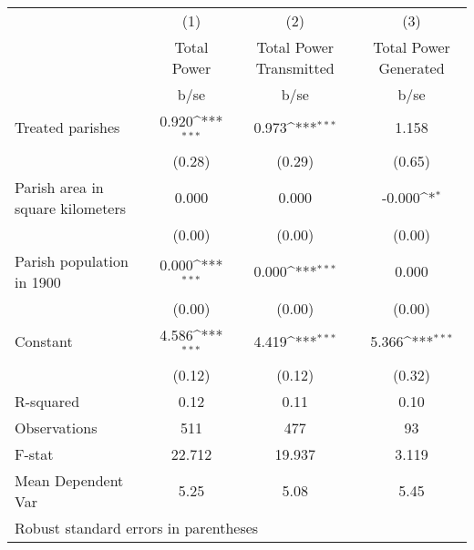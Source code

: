 {
\def\sym#1{\ifmmode^{#1}\else\(^{#1}\)\fi}
\begin{tabular}{l*{3}{c}}
\hline\hline
                    &\multicolumn{1}{c}{(1)}         &\multicolumn{1}{c}{(2)}         &\multicolumn{1}{c}{(3)}         \\
                    & Total Power         &Total Power Transmitted         &Total Power Generated         \\
                    &        b/se         &        b/se         &        b/se         \\
\hline
Treated parishes    &       0.920\sym{***}&       0.973\sym{***}&       1.158         \\
                    &      (0.28)         &      (0.29)         &      (0.65)         \\
Parish area in square kilometers&       0.000         &       0.000         &      -0.000\sym{*}  \\
                    &      (0.00)         &      (0.00)         &      (0.00)         \\
Parish population in 1900&       0.000\sym{***}&       0.000\sym{***}&       0.000         \\
                    &      (0.00)         &      (0.00)         &      (0.00)         \\
Constant            &       4.586\sym{***}&       4.419\sym{***}&       5.366\sym{***}\\
                    &      (0.12)         &      (0.12)         &      (0.32)         \\
\hline
R-squared           &        0.12         &        0.11         &        0.10         \\
Observations        &         511         &         477         &          93         \\
F-stat              &      22.712         &      19.937         &       3.119         \\
Mean Dependent Var  &        5.25         &        5.08         &        5.45         \\
\hline\hline
\multicolumn{4}{l}{\footnotesize Robust standard errors in parentheses}\\
\end{tabular}
}
